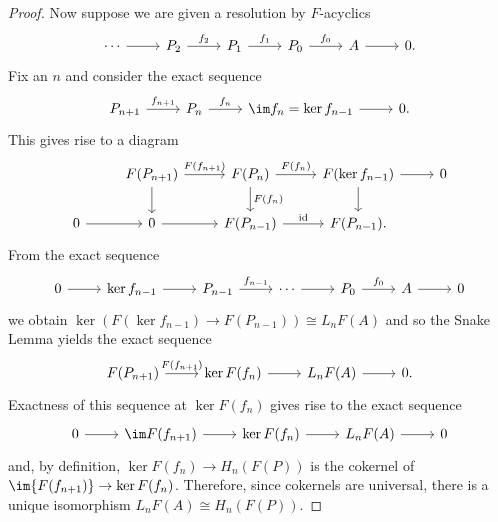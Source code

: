 \documentclass[10pt]{amsart}
\begin{document}
\begin{ex}
\begin{proof}
    Now suppose we are given a resolution by $F$-acyclics
    $$\begin{tikzcd}
      \cdots \arrow{r} & P_2 \arrow{r}{f_2} & P_1 \arrow{r}{f_1} & P_0 \arrow{r}{f_0} & A \arrow{r} & 0.
    \end{tikzcd}$$
    Fix an $n$ and consider the exact sequence
    $$\begin{tikzcd}
      P_{n+1} \arrow{r}{f_{n+1}} & P_{n} \arrow{r}{f_n} & \im f_n = \ker f_{n-1} \arrow{r} & 0.
    \end{tikzcd}$$
    This gives rise to a diagram
    $$\begin{tikzcd}
      & F(P_{n+1}) \arrow{r}{F(f_{n+1})} \arrow{d} & F(P_n) \arrow{r}{F(f_{n})} \arrow{d}{F(f_n)} & F(\ker f_{n-1}) \arrow{d}\arrow{r} & 0\\
      0 \arrow{r} & 0 \arrow{r} & F(P_{n-1}) \arrow{r}{\operatorname{id}} & F(P_{n-1}). & 
    \end{tikzcd}$$
    From the exact sequence
    $$\begin{tikzcd}
      0 \arrow{r} & \ker f_{n-1} \arrow{r} & P_{n-1} \arrow{r}{f_{n-1}} & \cdots \arrow{r} & P_0 \arrow{r}{f_0} & A \arrow{r} & 0
    \end{tikzcd}$$
    we obtain $\ker(F(\ker f_{n-1}) \rightarrow F(P_{n-1})) \cong L_nF(A)$ and so the Snake Lemma yields the exact sequence
    $$\begin{tikzcd}
      F(P_{n+1}) \arrow{r}{F(f_{n+1})} & \ker F(f_n) \arrow{r} & L_nF(A) \arrow{r} & 0.
     \end{tikzcd}$$
    Exactness of this sequence at $\ker{F(f_n)}$ gives rise to the exact sequence
     $$\begin{tikzcd}
       0 \arrow{r} & \im F(f_{n+1}) \arrow{r} & \ker F(f_n) \arrow{r} & L_nF(A) \arrow{r} & 0
    \end{tikzcd}$$
    and, by definition, $\ker{F(f_n)} \rightarrow H_n(F(P))$ is the cokernel of $\im{F(f_{n+1})} \rightarrow \ker{F(f_n)}$.
     Therefore, since cokernels are universal, there is a unique isomorphism $L_nF(A) \cong H_n(F(P))$.
  \end{proof}
\end{ex}

\begin{ex}
\end{ex}
\end{document}
